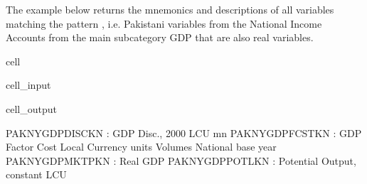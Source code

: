 \documentclass[letterpaper,10pt,english]{jupyterBook}
\begin{document}
\sphinxAtStartPar
The example below returns the mnemonics and descriptions of all variables matching the pattern , i.e. Pakistani variables from the National Income Accounts from the main sub\sphinxhyphen{}category GDP that are also real variables.

\begin{sphinxuseclass}{cell}\begin{sphinxVerbatimInput}

\begin{sphinxuseclass}{cell_input}
\begin{sphinxVerbatim}[commandchars=\\\{\}]
\PYG{p}{[}\PYG{p}{]}
\end{sphinxVerbatim}

\end{sphinxuseclass}\end{sphinxVerbatimInput}
\begin{sphinxVerbatimOutput}

\begin{sphinxuseclass}{cell_output}
\begin{sphinxVerbatim}[commandchars=\\\{\}]
PAKNYGDPDISCKN : GDP Disc., 2000 LCU mn
PAKNYGDPFCSTKN : GDP Factor Cost Local Currency units Volumes National base year
PAKNYGDPMKTPKN : Real GDP
PAKNYGDPPOTLKN : Potential Output, constant LCU
\end{sphinxVerbatim}

\end{sphinxuseclass}\end{sphinxVerbatimOutput}

\end{sphinxuseclass}
\end{document}
